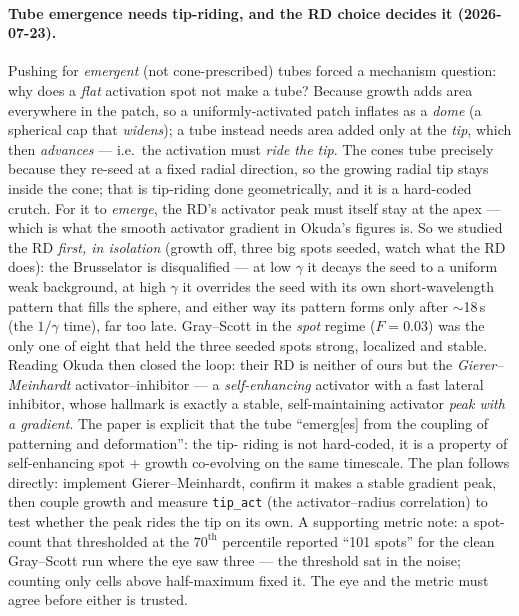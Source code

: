 \documentclass[11pt]{article}
\begin{document}
\paragraph{Tube emergence needs tip-riding, and the RD choice decides it (2026-07-23).} Pushing for
\emph{emergent} (not cone-prescribed) tubes forced a mechanism question: why does a \emph{flat} activation
spot not make a tube? Because growth adds area everywhere in the patch, so a uniformly-activated patch
inflates as a \emph{dome} (a spherical cap that \emph{widens}); a tube instead needs area added only at the
\emph{tip}, which then \emph{advances} --- i.e.\ the activation must \emph{ride the tip}. The cones tube
precisely because they re-seed at a fixed radial direction, so the growing radial tip stays inside the
cone; that is tip-riding done geometrically, and it is a hard-coded crutch. For it to \emph{emerge}, the
RD's activator peak must itself stay at the apex --- which is what the smooth activator gradient in Okuda's
figures is. So we studied the RD \emph{first, in isolation} (growth off, three big spots seeded, watch what
the RD does): the Brusselator is disqualified --- at low $\gamma$ it decays the seed to a uniform weak
background, at high $\gamma$ it overrides the seed with its own short-wavelength pattern that fills the
sphere, and either way its pattern forms only after $\sim$18\,s (the $1/\gamma$ time), far too late.
Gray--Scott in the \emph{spot} regime ($F\!=\!0.03$) was the only one of eight that held the three seeded
spots strong, localized and stable. Reading Okuda then closed the loop: their RD is neither of ours but the
\emph{Gierer--Meinhardt} activator--inhibitor --- a \emph{self-enhancing} activator with a fast lateral
inhibitor, whose hallmark is exactly a stable, self-maintaining activator \emph{peak with a gradient}. The
paper is explicit that the tube ``emerg[es] from the coupling of patterning and deformation'': the tip-%
riding is not hard-coded, it is a property of self-enhancing spot + growth co-evolving on the same
timescale. The plan follows directly: implement Gierer--Meinhardt, confirm it makes a stable gradient
peak, then couple growth and measure \texttt{tip\_act} (the activator--radius correlation) to test whether
the peak rides the tip on its own. A supporting metric note: a spot-count that thresholded at the
$70^{\text{th}}$ percentile reported ``101 spots'' for the clean Gray--Scott run where the eye saw three ---
the threshold sat in the noise; counting only cells above half-maximum fixed it. The eye and the metric
must agree before either is trusted.
\end{document}
